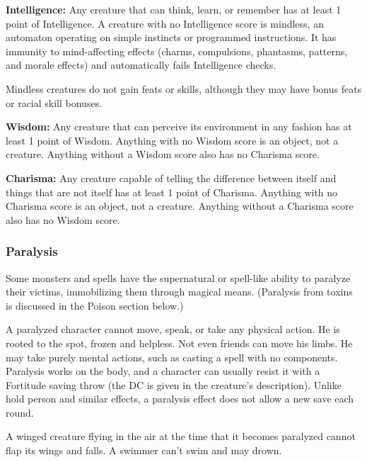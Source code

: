 \textbf{Intelligence:} Any creature that can think, learn, or remember has at least 1 point of Intelligence. A creature with no Intelligence score is mindless, an automaton operating on simple instincts or programmed instructions. It has immunity to mind-affecting effects (charms, compulsions, phantasms, patterns, and morale effects) and automatically fails Intelligence checks.

Mindless creatures do not gain feats or skills, although they may have bonus feats or racial skill bonuses.

\textbf{Wisdom:} Any creature that can perceive its environment in any fashion has at least 1 point of Wisdom. Anything with no Wisdom score is an object, not a creature. Anything without a Wisdom score also has no Charisma score.

\textbf{Charisma:} Any creature capable of telling the difference between itself and things that are not itself has at least 1 point of Charisma. Anything with no Charisma score is an object, not a creature. Anything without a Charisma score also has no Wisdom score.

\subsubsection{Paralysis}
Some monsters and spells have the supernatural or spell-like ability to paralyze their victims, immobilizing them through magical means. (Paralysis from toxins is discussed in the Poison section below.)

A paralyzed character cannot move, speak, or take any physical action. He is rooted to the spot, frozen and helpless. Not even friends can move his limbs. He may take purely mental actions, such as casting a spell with no components. Paralysis works on the body, and a character can usually resist it with a Fortitude saving throw (the DC is given in the creature's description). Unlike hold person and similar effects, a paralysis effect does not allow a new save each round.

A winged creature flying in the air at the time that it becomes paralyzed cannot flap its wings and falls. A swimmer can't swim and may drown.



